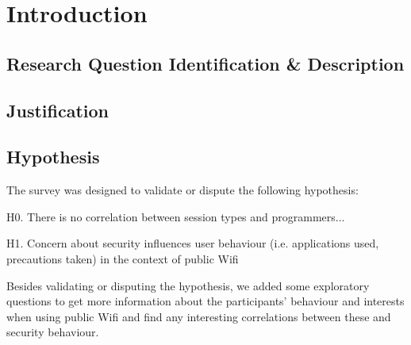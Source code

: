 \documentclass[11pt,notitlepage]{article}
\begin{document}

\section{Introduction}



\subsection{Research Question Identification \& Description}



\subsection{Justification}


\subsection{Hypothesis}
The survey was designed to validate or dispute the following hypothesis:

H0.  There is no correlation between session types and programmers...


H1. Concern about security influences user behaviour (i.e. applications used, precautions taken) in the context of public Wifi

Besides validating or disputing the hypothesis, we added some exploratory questions  to get more information about the participants’ behaviour and interests when using public Wifi and find any interesting correlations between these and security behaviour.


\end{document}
